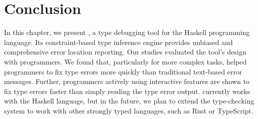 
\section{Conclusion}

In this chapter, we present \chameleon{}, a type debugging tool for the Haskell programming language. Its constraint-based type inference engine provides unbiased and comprehensive error location reporting. 
Our studies evaluated the tool's design with programmers. We found that, particularly for more complex tasks, \chameleon{} helped programmers to fix type errors more quickly than traditional text-based error messages. Further, programmers actively using \chameleon{} interactive features are shown to fix type errors faster than simply reading the type error output.
\chameleon{} currently works with the Haskell language, but in the future, we plan to extend the type-checking system to work with other strongly typed languages, such as Rust or TypeScript.


\goodbreak\noindent